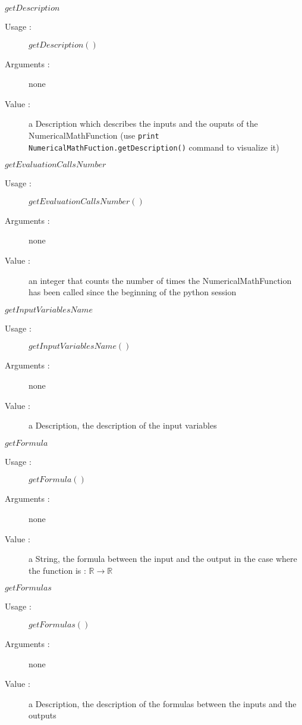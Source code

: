 \begin{description}
\begin{description}
  \item $getDescription$
    \begin{description}
    \item[Usage :] $getDescription()$
    \item[Arguments :] none
    \item[Value :] a Description which describes the inputs and the ouputs
      of the NumericalMathFunction
      (use \verb|print NumericalMathFuction.getDescription()| command to
      visualize it)
    \end{description}
    \bigskip

  \item $getEvaluationCallsNumber$
    \begin{description}
    \item[Usage :] $getEvaluationCallsNumber()$
    \item[Arguments :] none
    \item[Value :] an integer that counts the number of times the NumericalMathFunction has been called since the beginning of the python session
    \end{description}
    \bigskip

  \item $getInputVariablesName$
    \begin{description}
    \item[Usage :] $getInputVariablesName()$
    \item[Arguments :] none
    \item[Value :] a Description, the description of the input variables
    \end{description}
    \bigskip

  \item $getFormula$
    \begin{description}
    \item[Usage :] $getFormula()$
    \item[Arguments :] none
    \item[Value :] a String, the formula between the input and the output in the case where the function is : $\mathbb{R} \longrightarrow \mathbb{R}$
    \end{description}
    \bigskip

  \item $getFormulas$
    \begin{description}
    \item[Usage :] $getFormulas()$
    \item[Arguments :] none
    \item[Value :] a Description, the description of the formulas between the inputs and the outputs
    \end{description}
    \bigskip


\end{description}
\end{description}
